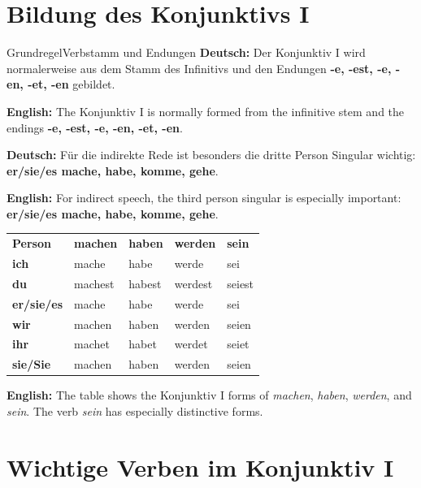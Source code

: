 \documentclass[a4paper,11pt]{article}
\newcommand{\GermanText}[1]{\textbf{Deutsch: }#1\par}
\newcommand{\EnglishText}[1]{{\small\color{SoftGray}\textbf{English: }#1\par}}
\begin{document}
    \section{Bildung des Konjunktivs I}

        \begin{grammarentry}{Grundregel}{Verbstamm und Endungen}
            \GermanText{Der Konjunktiv I wird normalerweise aus dem Stamm des Infinitivs und den Endungen \textbf{-e, -est, -e, -en, -et, -en} gebildet.}
            \EnglishText{The Konjunktiv I is normally formed from the infinitive stem and the endings \textbf{-e, -est, -e, -en, -et, -en}.}

            \GermanText{Für die indirekte Rede ist besonders die dritte Person Singular wichtig: \textbf{er/sie/es mache, habe, komme, gehe}.}
            \EnglishText{For indirect speech, the third person singular is especially important: \textbf{er/sie/es mache, habe, komme, gehe}.}
        \end{grammarentry}

        \begin{longtable}{>{\bfseries}p{2.6cm}|p{2.7cm}|p{2.7cm}|p{2.7cm}|p{2.7cm}}
            \rowcolor{HeaderBlueDark}
            \color{white}\textbf{Person} &
            \color{white}\textbf{machen} &
            \color{white}\textbf{haben} &
            \color{white}\textbf{werden} &
            \color{white}\textbf{sein} \\
            ich & mache & habe & werde & sei \\
            du & machest & habest & werdest & seiest \\
            er/sie/es & mache & habe & werde & sei \\
            wir & machen & haben & werden & seien \\
            ihr & machet & habet & werdet & seiet \\
            sie/Sie & machen & haben & werden & seien \\
        \end{longtable}

        \EnglishText{The table shows the Konjunktiv I forms of \textit{machen}, \textit{haben}, \textit{werden}, and \textit{sein}. The verb \textit{sein} has especially distinctive forms.}


    \section{Wichtige Verben im Konjunktiv I}
\end{document}
